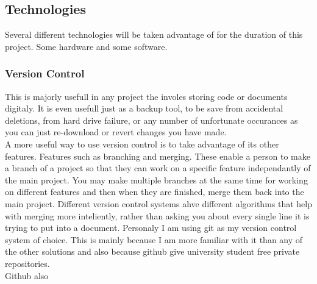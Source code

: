 \documentclass[11pt,fleqn,twoside]{article}
\begin{document}
\subsection{Technologies}
Several different technologies will be taken advantage of for the duration of this project.  Some hardware and some software.
\subsubsection{Version Control}
This is majorly usefull in any project the involes storing code or documents digitaly.  It is even usefull just as a backup tool, to be save from accidental deletions, from hard drive failure, or any number of unfortunate occurances as you can just re-download or revert changes you have made.
\\A more useful way to use version control is to take advantage of its other features.  Features such as branching and merging.  These enable a person to make a branch of a project so that they can work on a specific feature independantly of the main project.  You may make multiple branches at the same time for working on different features and then when they are finished, merge them back into the main project.  Different version control systems ahve different algorithms that help with merging more inteliently, rather than asking you about every single line it is trying to put into a document.  Personaly I am using git as my version control system of choice.  This is mainly because I am more familiar with it than any of the other solutions and also because github\cite{github} %
give university student free private repositories.
\\Github also
\end{document}

